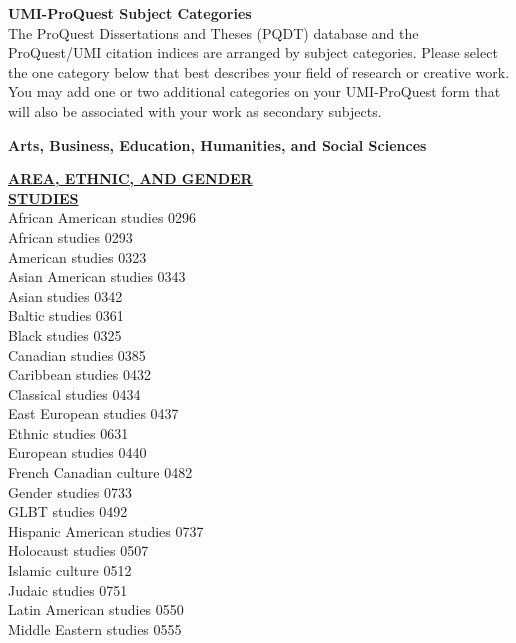 \documentclass[9pt,twoside]{article}
\newcommand{\categoryheading}[1]{{\fontsize{8}{11}\selectfont \textbf{\uline{#1}}}}
\newcommand{\fieldheading}[1]{{\large \textbf{#1}}}
\begin{document}
\clearpage
{}
\raggedcolumns
\setlength{\parskip}{\baselineskip}
\fancyhf{}
\rfoot{\the\numexpr\thepage-1\relax}
{\large\textbf{UMI-ProQuest Subject Categories}} \\
The ProQuest Dissertations and Theses (PQDT) database and the ProQuest/UMI citation indices are arranged by subject categories. Please select
the one category below that best describes your field of research or creative work. You may add one or two additional categories on your UMI-ProQuest
form that will also be associated with your work as secondary subjects.

\fieldheading{Arts, Business, Education, Humanities, and Social Sciences}

\fontsize{8}{10}\selectfont
\setlength\columnsep{.7in}
\begin{multicols}{3}
\categoryheading{AREA, ETHNIC, AND GENDER \\
STUDIES} \\
African American studies \hfill 0296 \\
African studies \hfill 0293 \\
American studies \hfill 0323 \\
Asian American studies \hfill 0343 \\
Asian studies \hfill 0342 \\
Baltic studies \hfill 0361 \\
Black studies \hfill 0325 \\
Canadian studies \hfill 0385 \\
Caribbean studies \hfill 0432 \\
Classical studies \hfill 0434 \\
East European studies \hfill 0437 \\
Ethnic studies \hfill 0631 \\
European studies \hfill 0440 \\
French Canadian culture \hfill 0482 \\
Gender studies \hfill 0733 \\
GLBT studies \hfill 0492 \\
Hispanic American studies \hfill 0737 \\
Holocaust studies \hfill 0507 \\
Islamic culture \hfill 0512 \\
Judaic studies \hfill 0751 \\
Latin American studies \hfill 0550 \\
Middle Eastern studies \hfill 0555 \\

\end{multicols}
\end{document}

